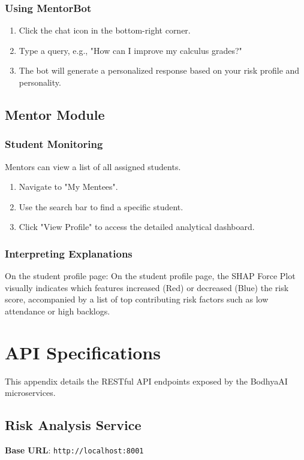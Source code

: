 \documentclass[12pt,a4paper]{report}
\begin{document}
\subsubsection{Using MentorBot}
\begin{enumerate}
    \item Click the chat icon in the bottom-right corner.
    \item Type a query, e.g., "How can I improve my calculus grades?"
    \item The bot will generate a personalized response based on your risk profile and personality.
\end{enumerate}

\subsection{Mentor Module}
\subsubsection{Student Monitoring}
Mentors can view a list of all assigned students.
\begin{enumerate}
    \item Navigate to "My Mentees".
    \item Use the search bar to find a specific student.
    \item Click "View Profile" to access the detailed analytical dashboard.
\end{enumerate}

\subsubsection{Interpreting Explanations}
On the student profile page:
On the student profile page, the SHAP Force Plot visually indicates which features increased (Red) or decreased (Blue) the risk score, accompanied by a list of top contributing risk factors such as low attendance or high backlogs.


\section{API Specifications}

This appendix details the RESTful API endpoints exposed by the BodhyaAI microservices.

\subsection{Risk Analysis Service}
\textbf{Base URL}: \texttt{http://localhost:8001}
\end{document}
